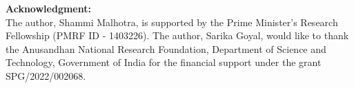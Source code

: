 \documentclass[11pt]{article}
\begin{document}
\vspace{.2cm}
{\textbf{Acknowledgment:}}\\
The author, Shammi Malhotra, is supported by the Prime Minister’s Research Fellowship (PMRF ID - 1403226). The author, Sarika Goyal, would like to thank the Anusandhan National Research Foundation, Department of Science and Technology, Government of India for the financial support under the grant SPG/2022/002068.





\end{document}
